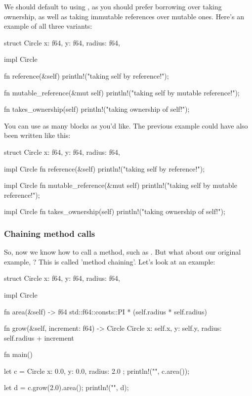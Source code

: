 \blank

We should default to using , as you should prefer borrowing over taking ownership, as well as taking immutable references over 
mutable ones. Here's an example of all three variants:

\begin{rustc}
struct Circle {
    x: f64,
    y: f64,
    radius: f64,
}

impl Circle {
    fn reference(&self) {
       println!("taking self by reference!");
    }

    fn mutable_reference(&mut self) {
       println!("taking self by mutable reference!");
    }

    fn takes_ownership(self) {
       println!("taking ownership of self!");
    }
}
\end{rustc}

You can use as many  blocks as you'd like. The previous example could have also been written like this:

\begin{rustc}
struct Circle {
    x: f64,
    y: f64,
    radius: f64,
}

impl Circle {
    fn reference(&self) {
       println!("taking self by reference!");
    }
}

impl Circle {
    fn mutable_reference(&mut self) {
       println!("taking self by mutable reference!");
    }
}

impl Circle {
    fn takes_ownership(self) {
       println!("taking ownership of self!");
    }
}
\end{rustc}

\subsubsection*{Chaining method calls}

So, now we know how to call a method, such as . But what about our original example, ? This is called 
'method chaining'. Let's look at an example:

\begin{rustc}
struct Circle {
    x: f64,
    y: f64,
    radius: f64,
}

impl Circle {
    fn area(&self) -> f64 {
        std::f64::consts::PI * (self.radius * self.radius)
    }

    fn grow(&self, increment: f64) -> Circle {
        Circle { x: self.x, y: self.y, radius: self.radius + increment }
    }
}

fn main() {
    let c = Circle { x: 0.0, y: 0.0, radius: 2.0 };
    println!("{}", c.area());

    let d = c.grow(2.0).area();
    println!("{}", d);
}
\end{rustc}

